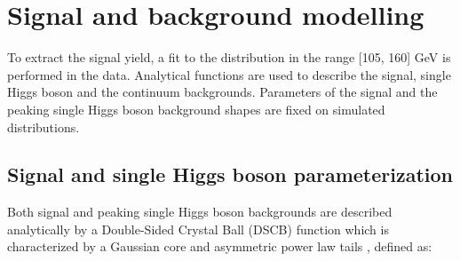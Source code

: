 \section{Signal and background modelling}
\label{HHyybb:Modelling}

To extract the \HHyybb signal yield, a fit to the \myy distribution in the range [105, 160] GeV is performed in the data. Analytical functions are used to describe the signal, single Higgs boson and the continuum backgrounds. Parameters of the signal and the peaking single Higgs boson background shapes are fixed on simulated distributions.

\subsection{Signal and single Higgs boson parameterization}
\label{HHyybb:Modelling:Sig}

Both signal and peaking single Higgs boson backgrounds are described analytically by a Double-Sided Crystal Ball (DSCB) function which is characterized by a Gaussian core and asymmetric power law tails \cite{Higgs_2018}, defined as:

